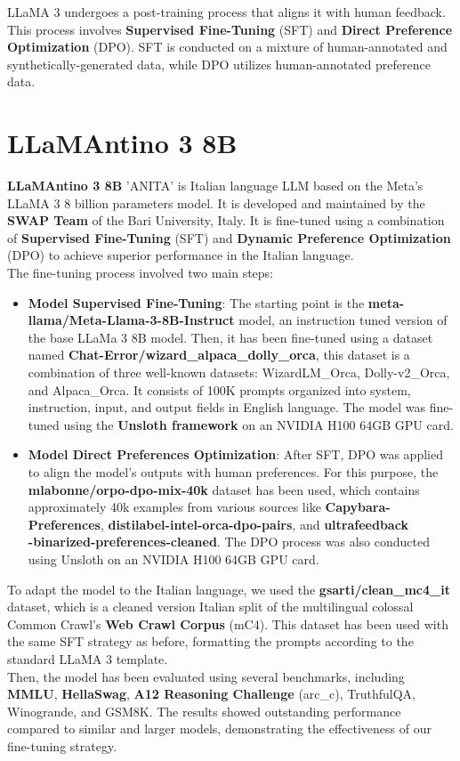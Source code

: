 \documentclass{article}
\begin{document}
		LLaMA 3 undergoes a post-training process that aligns it with human feedback. 
		This process involves \textbf{Supervised Fine-Tuning} (SFT) and \textbf{Direct Preference Optimization} (DPO). SFT is conducted on a mixture of human-annotated and synthetically-generated data, while DPO utilizes human-annotated preference data.
		
	\section{LLaMAntino 3 8B}
	\textbf{LLaMAntino 3 8B} 'ANITA' is Italian language LLM based on the Meta's LLaMA 3 8 billion parameters model. It is developed and maintained by the \textbf{SWAP Team} of the Bari University, Italy. It is fine-tuned using a combination of \textbf{Supervised Fine-Tuning} (SFT) and \textbf{Dynamic Preference Optimization} (DPO) to achieve superior performance in the Italian language. \\
	The fine-tuning process involved two main steps: 
	
	\begin{itemize}
		\item 
			\textbf{Model Supervised Fine-Tuning}: The starting point is the \textbf{meta-llama/Meta-Llama-3-8B-Instruct} model, an instruction tuned version of the base LLaMa 3 8B model. 
			Then, it has been fine-tuned using a dataset named \textbf{Chat-Error/wizard\_alpaca\_dolly\_orca}, this dataset is a combination of three well-known datasets: WizardLM\_Orca, Dolly-v2\_Orca, and Alpaca\_Orca. 
			It consists of 100K prompts organized into system, instruction, input, and output fields in English language.	The model was fine-tuned using the \textbf{Unsloth framework} on an NVIDIA H100 64GB GPU card.
		
		\item 
			\textbf{Model Direct Preferences Optimization}: After SFT, DPO was applied to align the model's outputs with human preferences. For this purpose, the \textbf{mlabonne/orpo-dpo-mix-40k} dataset has been used, which contains approximately 40k examples from various sources like \textbf{Capybara-Preferences}, \textbf{distilabel-intel-orca-dpo-pairs}, and \textbf{ultrafeedback\\-binarized-preferences-cleaned}.
			The DPO process was also conducted using Unsloth on an NVIDIA H100 64GB GPU card.
	\end{itemize}
	
	To adapt the model to the Italian language, we used the \textbf{gsarti/clean\_mc4\_it} dataset, which is a cleaned version Italian split of the multilingual colossal Common Crawl's \textbf{Web Crawl Corpus} (mC4).
	This dataset has been used with the same SFT strategy as before, formatting the prompts according to the standard LLaMA 3 template. \\
	Then, the model has been evaluated using several benchmarks, including \textbf{MMLU}, \textbf{HellaSwag},\textbf{ A12 Reasoning Challenge} (arc\_c), TruthfulQA, Winogrande, and GSM8K. 
	The results showed outstanding performance compared to similar and larger models, demonstrating the effectiveness of our fine-tuning strategy.
	
\end{document}

